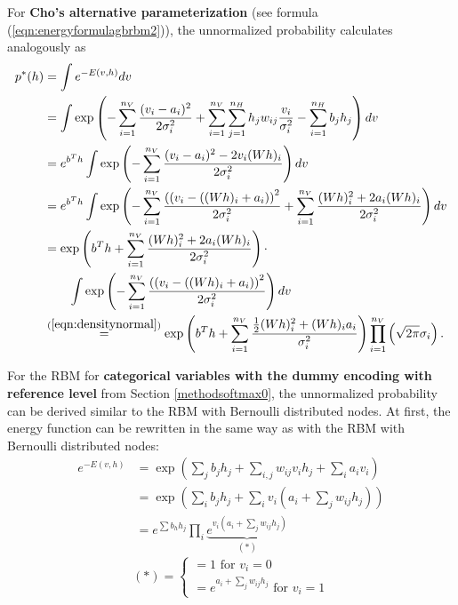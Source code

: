 \documentclass[12pt]{article}
\begin{document}
For {\bf Cho's alternative parameterization} (see formula (\ref{eqn:energyformulagbrbm2})), the unnormalized probability calculates analogously as
\begin{align*}
   p^*(h) &= \int e^{-E \left(v,h \right)} dv \\
   &= \int \exp \left( - \sum_{i=1}^{n_V} \frac{(v_i - a_i)^2}{2\sigma_i^2} + \sum_{i=1}^{n_V} \sum_{j=1}^{n_H} h_j w_{ij} \frac{v_i}{\sigma_i^2} - \sum_{i=1}^{n_H} b_j h_j \right) dv \\
   &= e^{b^T h} \int \exp\left( - \sum_{i=1}^{n_V} \frac{(v_i - a_i)^2 - 2 v_i (Wh)_i}{2 \sigma_i^2} \right) dv \\
   &= e^{b^T h} \int \exp \left( - \sum_{i=1}^{n_V} \frac{\left((v_i - ((Wh)_i + a_i) \right)^2}{2 \sigma_i^2}  + \sum_{i=1}^{n_V} \frac{(Wh)_i^2 + 2 a_i (Wh)_i}{2\sigma_i^2} \right) dv\\
   &= \exp \left( b^T h + \sum_{i=1}^{n_V} \frac{(Wh)_i^2 + 2 a_i (Wh)_i}{2\sigma_i^2} \right) \cdot \\
   & \quad \quad \int \exp \left(- \sum_{i=1}^{n_V} \frac{\left((v_i - ((Wh)_i + a_i) \right)^2}{2 \sigma_i^2} \right) dv\\
   &\stackrel{(\ref{eqn:densitynormal})}{=} \exp \left( b^T h + \sum_{i=1}^{n_V} \frac{\frac{1}{2}(Wh)_i^2 + (Wh)_i a_i}{\sigma_i^2} \right ) \prod_{i=1}^{n_V}\left(\sqrt{2\pi} \sigma_i \right).
\end{align*}

For the RBM for {\bf categorical variables with the dummy encoding with reference level} from Section \ref{methodsoftmax0}, the unnormalized probability can be derived similar to the RBM with Bernoulli distributed nodes. At first, the energy function can be rewritten in the same way as with the RBM with Bernoulli distributed nodes:
\begin{align}
e^{-E(v,h)} &= \exp \left(\sum_j b_j h_j + \sum_{i,j} w_{ij} v_i h_j + \sum_i a_i v_i \right) \nonumber \\
&= \exp \left( \sum_i b_j h_j + \sum_i v_i \left( a_i + \sum_j w_{ij} h_j \right) \right) \nonumber \\
&= e^{\sum b_h h_j} \prod_i \underbrace{e^{v_i (a_i + \sum_j w_{ij} h_j)}}_{(*)}
\label{eqn:freeenergytrick}
\end{align}
\begin{equation*}
(*) = \left\{
\begin{array}{l}
 =1 \text{ for } v_i = 0 \\
 = e^{a_i +\sum_j w_{ij} h_j} \text{ for } v_i = 1
\end{array} \right.
\end{equation*}
\end{document}
